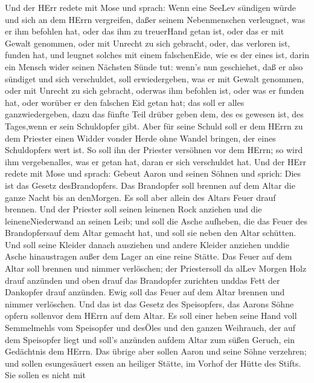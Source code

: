  Und der HErr redete mit Mose und sprach:  Wenn
eine SeeLev sündigen würde und sich an dem HErrn vergreifen, daßer
seinem Nebenmenschen verleugnet, was er ihm befohlen hat, oder das ihm
zu treuerHand getan ist, oder das er mit Gewalt genommen, oder mit
Unrecht zu sich gebracht,  oder, das verloren ist, funden
hat, und leugnet solches mit einem falschenEide, wie es der eines ist,
darin ein Mensch wider seinen Nächsten Sünde tut:  wenn's
nun geschiehet, daß er also sündiget und sich verschuldet, soll
erwiedergeben, was er mit Gewalt genommen, oder mit Unrecht zu sich
gebracht, oderwas ihm befohlen ist, oder was er funden hat, 
oder worüber er den falschen Eid getan hat; das soll er alles
ganzwiedergeben, dazu das fünfte Teil drüber geben dem, des es gewesen
ist, des Tages,wenn er sein Schuldopfer gibt.  Aber für
seine Schuld soll er dem HErrn zu dem Priester einen Widder vonder Herde
ohne Wandel bringen, der eines Schuldopfers wert ist.  So
soll ihn der Priester versöhnen vor dem HErrn; so wird ihm
vergebenalles, was er getan hat, daran er sich verschuldet hat.
 Und der HErr redete mit Mose und sprach: 
Gebeut Aaron und seinen Söhnen und sprich: Dies ist das Gesetz
desBrandopfers. Das Brandopfer soll brennen auf dem Altar die ganze
Nacht bis an denMorgen. Es soll aber allein des Altars Feuer drauf
brennen.  Und der Priester soll seinen leinenen Rock
anziehen und die leineneNiederwand an seinen Leib; und soll die Asche
aufheben, die das Feuer des Brandopfersauf dem Altar gemacht hat, und
soll sie neben den Altar schütten.  Und soll seine Kleider
danach ausziehen und andere Kleider anziehen unddie Asche hinaustragen
außer dem Lager an eine reine Stätte.  Das Feuer auf dem
Altar soll brennen und nimmer verlöschen; der Priestersoll da alLev
Morgen Holz drauf anzünden und oben drauf das Brandopfer zurichten
unddas Fett der Dankopfer drauf anzünden.  Ewig soll das
Feuer auf dem Altar brennen und nimmer verlöschen.  Und das
ist das Gesetz des Speisopfers, das Aarons Söhne opfern sollenvor dem
HErrn auf dem Altar.  Es soll einer heben seine Hand voll
Semmelmehls vom Speisopfer und desÖles und den ganzen Weihrauch, der auf
dem Speisopfer liegt und soll's anzünden aufdem Altar zum süßen Geruch,
ein Gedächtnis dem HErrn.  Das übrige aber sollen Aaron und
seine Söhne verzehren; und sollen esungesäuert essen an heiliger Stätte,
im Vorhof der Hütte des Stifts.  Sie sollen es nicht mit

